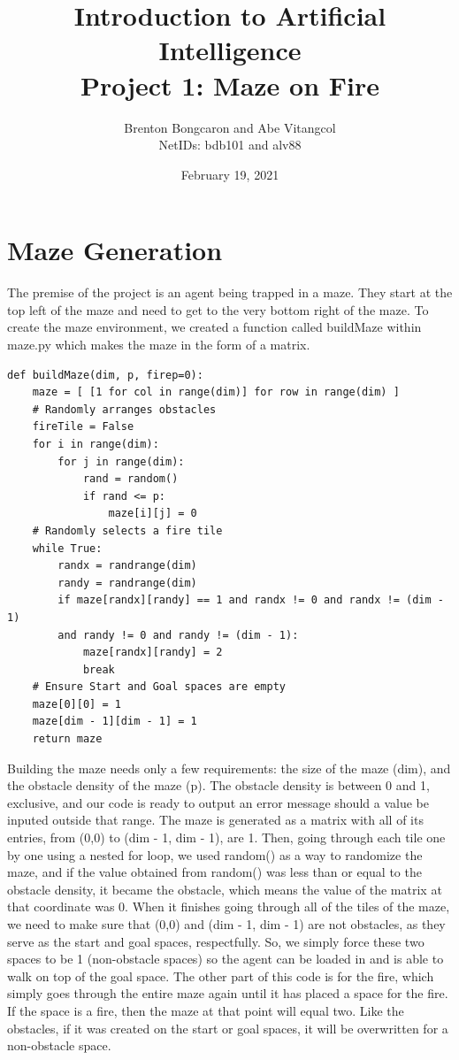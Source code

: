 \documentclass[11pt]{article}
\title{\textbf{Introduction to Artificial Intelligence\\
		\large Project 1: Maze on Fire}}
\author{Brenton Bongcaron and Abe Vitangcol\\NetIDs: bdb101 and alv88}
\date{February 19, 2021}
\begin{document}
	\maketitle
	\pagebreak
\section{Maze Generation}
The premise of the project is an agent being trapped in a maze. They start at the top left of the maze and need to get to the very bottom right of the maze. To create the maze environment, we created a function called buildMaze within maze.py which makes the maze in the form of a matrix.
\begin{verbatim}
def buildMaze(dim, p, firep=0):
    maze = [ [1 for col in range(dim)] for row in range(dim) ]
    # Randomly arranges obstacles
    fireTile = False
    for i in range(dim):
        for j in range(dim):
            rand = random()
            if rand <= p:
                maze[i][j] = 0
    # Randomly selects a fire tile
    while True:
        randx = randrange(dim)
        randy = randrange(dim)
        if maze[randx][randy] == 1 and randx != 0 and randx != (dim - 1)
        and randy != 0 and randy != (dim - 1):
            maze[randx][randy] = 2
            break
    # Ensure Start and Goal spaces are empty
    maze[0][0] = 1
    maze[dim - 1][dim - 1] = 1
    return maze

\end{verbatim}
Building the maze needs only a few requirements: the size of the maze (dim), and the obstacle density of the maze (p). The obstacle density is between 0 and 1, exclusive, and our code is ready to output an error message should a value be inputed outside that range. The maze is generated as a matrix with all of its entries, from (0,0) to (dim - 1, dim - 1), are 1. Then, going through each tile one by one using a nested for loop, we used random() as a way to randomize the maze, and if the value obtained from random() was less than or equal to the obstacle density, it became the obstacle, which means the value of the matrix at that coordinate was 0. When it finishes going through all of the tiles of the maze, we need to make sure that (0,0) and (dim - 1, dim - 1) are not obstacles, as they serve as the start and goal spaces, respectfully. So, we simply force these two spaces to be 1 (non-obstacle spaces) so the agent can be loaded in and is able to walk on top of the goal space.
The other part of this code is for the fire, which simply goes through the entire maze again until it has placed a space for the fire. If the space is a fire, then the maze at that point will equal two. Like the obstacles, if it was created on the start or goal spaces, it will be overwritten for a non-obstacle space.
	\pagebreak
\end{document}
